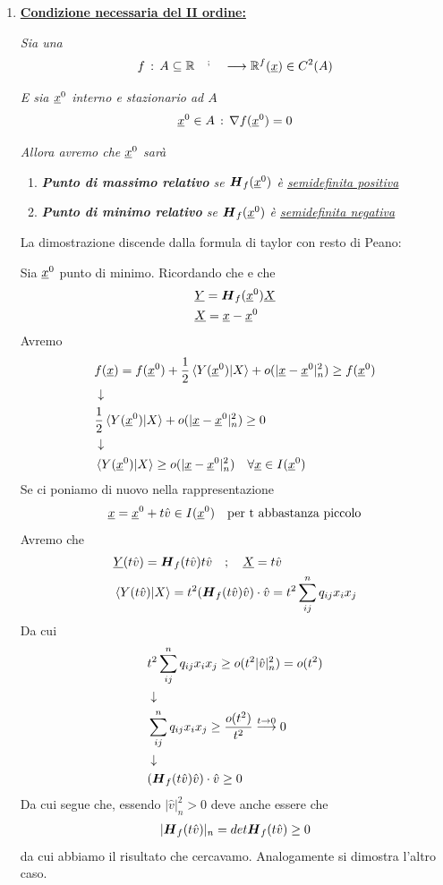 \begin{enumerate}
	\item \textbf{\underline{Condizione necessaria del II ordine:}}
	
	\textit{Sia una}
	\begin{align}
		f \, : \, A\subseteq \mathbb{R}^{\quad ; \quad} \longrightarrow \mathbb{R}^{f}(\underline{x})\in C^2(A)
	\end{align}
	
	\textit{E sia $\underline{x}^0$ interno e stazionario ad $A$}
	\begin{align}
		\underline{x}^0\in A \, : \, \nabla f(\underline{x}^0)=0
	\end{align}
	
	\textit{Allora avremo che $\underline{x}^0$ sarà}
	\begin{enumerate}
		\item \textit{\textbf{Punto di massimo relativo} se $\boldsymbol{H}_{f} (\underline{x}^0)$ è \underline{semidefinita positiva}}
		\item \textit{\textbf{Punto di minimo relativo} se $\boldsymbol{H}_{f} (\underline{x}^0)$ è \underline{semidefinita negativa}}
	\end{enumerate}
	
	\bigskip
	
	La dimostrazione discende dalla formula di taylor con resto di Peano:
	
	Sia $\underline{x}^0$ punto di minimo. Ricordando che  e che 
	\begin{align}
		{}&\underline{Y} = \boldsymbol{H}_{f} (\underline{x}^0) \underline{X}\\
		& \underline{X} = \underline{x} - \underline{x}^0
	\end{align}
	Avremo
	\begin{align}
		{}&f(\underline{x}) = f(\underline{x}^0) + \frac{1}{2} \braket{Y(\underline{x}^0)|X} + o(|\underline{x} -\underline{x}^0|_n^2)\geq f(\underline{x}^0) \nonumber \\ &\downarrow \nonumber \\
		& \frac{1}{2} \braket{Y(\underline{x}^0)|X} + o(|\underline{x} -\underline{x}^0|_n^2) \geq 0 \nonumber \\ &\downarrow \nonumber \\
		& \braket{Y(\underline{x}^0)|X} \geq o(|\underline{x} -\underline{x}^0|_n^2) \quad \forall \underline{x} \in I(\underline{x}^0)
	\end{align}
	Se ci poniamo di nuovo nella rappresentazione 
	\begin{align}
		\underline{x} = \underline{x}^0 + t \hat{v} \in I(\underline{x}^0) \quad \text{per t abbastanza piccolo}
	\end{align}
	Avremo che
	\begin{align}
		&\underline{Y}(t \hat{v}) = \boldsymbol{H}_{f} (t \hat{v}) t \hat{v} \quad ; \quad \underline{X}= t\hat{v}\\
		&\braket{Y(t \hat{v})|X}= t^2 (\boldsymbol{H}_{f} (t \hat{v}) \hat{v} )\cdot\hat{v} = t^2\sum_{ij}^{n} q_{ij} x_i x_j	 
	\end{align}
	Da cui
	\begin{align}
		&t^2 \sum_{ij}^{n} q_{ij} x_i x_j	 \geq o(t^2 |\hat{v}|_n^2)= o( t^2) \nonumber \\ &\downarrow \nonumber \\
		&\sum_{ij}^{n} q_{ij} x_i x_j	 \geq \frac{o(t^2)}{t^2} \overset{t \rightarrow 0}{\longrightarrow} 0 \nonumber \\ &\downarrow \nonumber \\
		&(\boldsymbol{H}_{f} (t \hat{v}) \hat{v} )\cdot\hat{v} \geq 0
	\end{align}
	Da cui segue che, essendo $|\hat{v}|_n^2>0$ deve anche essere che
	\begin{align}
		|\boldsymbol{H}_{f} (t \hat{v})|_n  = det\boldsymbol{H}_{f} (t \hat{v}) \geq 0
	\end{align}
	da cui abbiamo il risultato che cercavamo. Analogamente si dimostra l'altro caso.
	

\end{enumerate}

